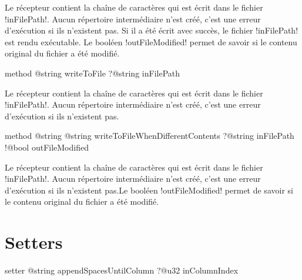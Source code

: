 Le récepteur contient la chaîne de caractères qui est écrit dans le fichier \ggsq!inFilePath!. Aucun répertoire intermédiaire n'est créé, c'est une erreur d'exécution si ils n'existent pas. Si il a été écrit avec succès, le fichier \ggsq!inFilePath! est rendu exécutable. Le booléen \ggsq!outFileModified! permet de savoir si le contenu original du fichier a été modifié.










\begin{galgas4box}
method @string writeToFile ?@string inFilePath
\end{galgas4box}

Le récepteur contient la chaîne de caractères qui est écrit dans le fichier \ggsq!inFilePath!. Aucun répertoire intermédiaire n'est créé, c'est une erreur d'exécution si ils n'existent pas.










\begin{galgas4box}
method @string @string writeToFileWhenDifferentContents
    ?@string inFilePath
    !@bool outFileModified
\end{galgas4box}

Le récepteur contient la chaîne de caractères qui est écrit dans le fichier \ggsq!inFilePath!. Aucun répertoire intermédiaire n'est créé, c'est une erreur d'exécution si ils n'existent pas.Le booléen \ggsq!outFileModified! permet de savoir si le contenu original du fichier a été modifié.















\section{Setters}


\begin{galgas4box}
setter @string appendSpacesUntilColumn ?@u32 inColumnIndex
\end{galgas4box}

